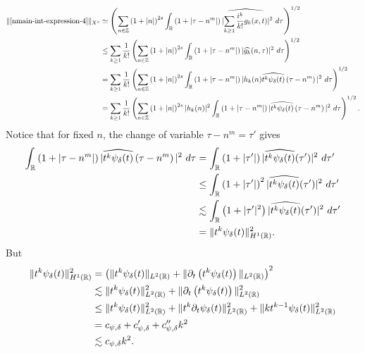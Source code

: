 \begin{equation}
	\label{n2n}
	\begin{split}
		\|\eqref{nmain-int-expression-4}\|_{X^s} 
		& \simeq \left( \sum_{n \in \mathbb{Z}} \left (1 + |n| \right )^{2s} \int_{\mathbb{R}} \left( 1 + | \tau -
		n^{m }
		|
		\right) | \widehat{\sum_{k \ge 1} \frac{i^k}{k!}g_k(x,t)} |^2 \ d \tau
		\right)^{1/2}
		\\
		& \le \sum_{k \ge 1} \frac{1}{k!}\left( \sum_{n \in \mathbb{Z}} \left (1 + |n| \right )^{2s}
		\int_{\mathbb{R}} \left( 1 + | \tau - n^{m } | \right) | \widehat{g_k}(n, \tau) |^2 \
		d \tau \right)^{1/2}
		\\
		& = \sum_{k \ge 1} \frac{1}{k!} \left( \sum_{n \in \mathbb{Z}} \left (1 + |n| \right )^{2s}
		\int_{\mathbb{R}} \left( 1 + | \tau - n^{m } | \right) | h_k(n) \widehat{t^k
		\psi_{\delta}(t)} \left( \tau - n^{m } \right) |^2 \ d \tau \right)^{1/2}
		\\
		& = \sum_{k \ge 1} \frac{1}{k!} \left( \sum_{n \in \mathbb{Z}} \left (1 + |n| \right )^{2s} |
		h_k(n) |^2 \int_{\mathbb{R}} \left( 1 + | \tau - n^{m } | \right) | \widehat{t^k
		\psi_{\delta}(t)} \left( \tau - n^{m } \right) |^2 \ d \tau \right)^{1/2}.
	\end{split}
\end{equation}
%
%
Notice that for fixed $n$, the change of variable $\tau - n^{m } = \tau'$
gives
%
%
\begin{equation}
	\label{n3n}
	\begin{split}
		\int_{\mathbb{R}} \left( 1 + | \tau - n^{m } | \right) | \widehat{t^{k}
		\psi_{\delta}(t)}\left( \tau - n^{m } \right) |^2 \ d \tau
		& = \int_{\mathbb{R}} \left( 1 + |\tau'| \right) | \widehat{t^k \psi_{\delta}(t)}(\tau') |^2 \
		d \tau'
		\\
		& \le \int_{\mathbb{R}} \left( 1 + |\tau'| \right)^2 | \widehat{t^k \psi_{\delta}(t)}(\tau')
		|^2 \ d \tau'
		\\
		& \lesssim \int_{\mathbb{R}} \left( 1 + | \tau' |^2 \right) | \widehat{t^{k}
		\psi_{\delta}(t)}(\tau') |^2 \ d \tau'
		\\
		& = \|t^k \psi_{\delta}(t) \|_{H^1(\mathbb{R})}^2.
	\end{split}
\end{equation}
%
%
But
%
%
\begin{equation}
	\label{n4n}
	\begin{split}
		\|t^k \psi_{\delta}(t) \|_{H^1(\mathbb{R})}^2
		& = \left( \|t^k \psi_{\delta}(t)\|_{L^2(\mathbb{R})} + \|\partial_t \left( t^k \psi_{\delta}(t)
		\right)\|_{L^2(\mathbb{R})} \right)^2
		\\
		& \lesssim \|t^{k}\psi_{\delta}(t) \|_{L^2(\mathbb{R})}^2 + \|\partial_t \left (t^{k}
		\psi_{\delta}(t) \right )\|_{L^2(\mathbb{R})}^2
		\\
		& \le \|t^k \psi_{\delta}(t) \|_{L^2(\mathbb{R})}^2 + \|t^k \partial_t \psi_{\delta}(t)
		\|_{L^2(\mathbb{R})}^2 + \|k t^{k -1} \psi_{\delta}(t) \|_{L^2(\mathbb{R})}^2
		\\
		& = c_{\psi, \delta} + c_{\psi, \delta}' + c_{\psi, \delta}''k^2 
		\\
    & \lesssim c_{\psi, \delta} k^2.
	\end{split}
\end{equation}
